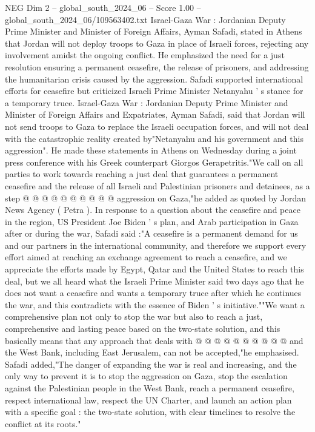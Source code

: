 \begin{textsample}{NEG Dim 2 – global\_south\_2024\_06 – Score 1.00 – global\_south\_2024\_06/109563402.txt}  \label{ex:f2_neg_389}
Israel-Gaza War : Jordanian Deputy Prime Minister and Minister of Foreign Affairs, Ayman Safadi, stated in Athens that Jordan will not deploy troops to Gaza in place of Israeli forces, rejecting any involvement amidst the ongoing conflict.
He emphasized the need for a just resolution ensuring a permanent ceasefire, the release of prisoners, and addressing the humanitarian crisis caused by the aggression.
Safadi supported international efforts for ceasefire but criticized Israeli Prime Minister Netanyahu ' s stance for a temporary truce.
Israel-Gaza War : Jordanian Deputy Prime Minister and Minister of Foreign Affairs and Expatriates, Ayman Safadi, said that Jordan will not send troops to Gaza to replace the Israeli occupation forces, and will not deal with the catastrophic reality created by"Netanyahu and his government and this aggression".
He made these statements in Athens on Wednesday during a joint press conference with his Greek counterpart Giorgos Gerapetritis."We call on all parties to work towards reaching a just deal that guarantees a permanent ceasefire and the release of all Israeli and Palestinian prisoners and detainees, as a step @ @ @ @ @ @ @ @ @ @ aggression on Gaza,"he added as quoted by Jordan News Agency ( Petra ).
In response to a question about the ceasefire and peace in the region, US President Joe Biden ' s plan, and Arab participation in Gaza after or during the war, Safadi said :"A ceasefire is a permanent demand for us and our partners in the international community, and therefore we support every effort aimed at reaching an exchange agreement to reach a ceasefire, and we appreciate the efforts made by Egypt, Qatar and the United States to reach this deal, but we all heard what the Israeli Prime Minister said two days ago that he does not want a ceasefire and wants a temporary truce after which he continues the war, and this contradicts with the essence of Biden ' s initiative.""We want a comprehensive plan not only to stop the war but also to reach a just, comprehensive and lasting peace based on the two-state solution, and this basically means that any approach that deals with @ @ @ @ @ @ @ @ @ @ and the West Bank, including East Jerusalem, can not be accepted,"he emphasised.
Safadi added,"The danger of expanding the war is real and increasing, and the only way to prevent it is to stop the aggression on Gaza, stop the escalation against the Palestinian people in the West Bank, reach a permanent ceasefire, respect international law, respect the UN Charter, and launch an action plan with a specific goal : the two-state solution, with clear timelines to resolve the conflict at its roots."

\end{textsample}
